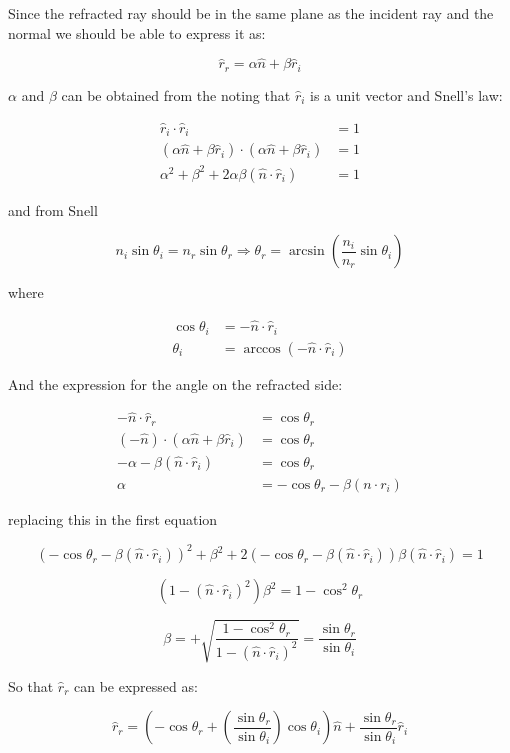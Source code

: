 \documentclass[10pt,a4paper]{article}
\begin{document}
Since the refracted ray should be in the same plane as the incident ray and the normal we should be able to express it as:

\[
\hat r_r = \alpha  \hat n + \beta \hat r_i
\]

$\alpha$ and $\beta$ can be obtained from the noting that $\hat r_i$ is a unit vector 
and Snell's law:

\begin{align*}
\hat r_i \cdot \hat r_i                                                   & = 1 \\
(\alpha  \hat n + \beta \hat r_i) \cdot (\alpha  \hat n + \beta \hat r_i) & = 1 \\
\alpha^2 + \beta^2 + 2 \alpha \beta (\hat n \cdot \hat r_i)               & = 1 
\end{align*}


and from Snell

\[
n_i \sin{\theta_i} = n_r \sin{\theta_r}
\Rightarrow
\theta_r = \arcsin{ \left( \dfrac{n_i}{n_r}\sin{\theta_i} \right) }
\]

where

\begin{align*}
\cos \theta_i  & = -\hat n \cdot \hat r_i                          \\
\theta_i       & = \arccos{\left( -\hat n \cdot \hat r_i \right)} 
\end{align*}



And the expression for the angle on the refracted side:

\begin{align*}
-\hat n \cdot \hat r_r                          & = \cos\theta_r  \\
(-\hat n)\cdot (\alpha \hat n +\beta \hat r_i)  & = \cos\theta_r  \\
-\alpha-\beta (\hat n\cdot \hat r_i)            & = \cos\theta_r  \\
\alpha                           & = -\cos\theta_r -\beta(n \cdot r_i) 
\end{align*}


replacing this in the first equation

\[
(- \cos\theta_r - \beta (\hat n \cdot \hat r_i))^2+ \beta^2 + 2(-\cos\theta_r-\beta(\hat n\cdot \hat r_i))\beta(\hat n \cdot \hat r_i)=1
\]

\[
(1-(\hat n\cdot \hat r_i)^2)\beta^2 = 1-\cos^2\theta_r
\]

\[
\beta = + \sqrt{\dfrac{1-\cos^2\theta_r}{1-(\hat n \cdot \hat r_i)^2}}
= \dfrac{\sin\theta_r}{\sin\theta_i}
\]

So that $\hat r_r$ can be expressed as:

\[
\hat r_r = \left( -\cos\theta_r+\left( \dfrac{\sin\theta_r}{\sin\theta_i}\right) \cos\theta_i \right) \hat n + 
\dfrac{\sin\theta_r}{\sin\theta_i} \hat r_i
\]
\end{document}
